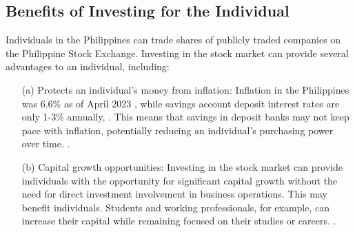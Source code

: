 \subsection{Benefits of Investing for the Individual}
Individuals in the Philippines can trade shares of publicly traded 
companies on the Philippine Stock Exchange. Investing in the stock market 
can provide several advantages to an individual, including:
\begin{itemize}
    \item[(a)] Protects an individual's money from inflation: Inflation in the 
    Philippines was 6.6\% as of April 2023
    \cite{NEDA2023},
    while savings account deposit interest rates are only 1-3\% annually, 
    \cite{BSP19}. 
    This means that savings in deposit banks may not keep pace with inflation, 
    potentially reducing an individual's purchasing power over time.
    \cite{RBC, EdwardJones}.
    \item[(b)] Capital growth opportunities: Investing in the stock market can 
    provide individuals with the opportunity for significant capital growth 
    without the need for direct investment involvement in business operations. 
    This may benefit individuals. Students and working professionals, for example, 
    can increase their capital while remaining focused on their studies or careers.
    \cite{USSecAndExComm}.
\end{itemize}